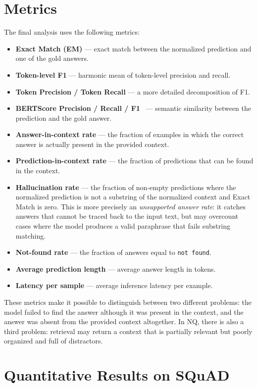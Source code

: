 \documentclass[a4paper,12pt]{article}
\begin{document}
\section{Metrics}
The final analysis uses the following metrics:
\begin{itemize}
    \item \textbf{Exact Match (EM)} — exact match between the normalized prediction and one of the gold answers.
    \item \textbf{Token-level F1} — harmonic mean of token-level precision and recall.
    \item \textbf{Token Precision / Token Recall} — a more detailed decomposition of F1.
    \item \textbf{BERTScore Precision / Recall / F1}~\cite{bertscore} — semantic similarity between the prediction and the gold answer.
    \item \textbf{Answer-in-context rate} — the fraction of examples in which the correct answer is actually present in the provided context.
    \item \textbf{Prediction-in-context rate} — the fraction of predictions that can be found in the context.
    \item \textbf{Hallucination rate} — the fraction of non-empty predictions where the normalized prediction is not a substring of the normalized context and Exact Match is zero. This is more precisely an \emph{unsupported answer rate}: it catches answers that cannot be traced back to the input text, but may overcount cases where the model produces a valid paraphrase that fails substring matching.
    \item \textbf{Not-found rate} — the fraction of answers equal to \texttt{not found}.
    \item \textbf{Average prediction length} — average answer length in tokens.
    \item \textbf{Latency per sample} — average inference latency per example.
\end{itemize}
These metrics make it possible to distinguish between two different problems: the model failed to find the answer although it was present in the context, and the answer was absent from the provided context altogether. In NQ, there is also a third problem: retrieval may return a context that is partially relevant but poorly organized and full of distractors.

\section{Quantitative Results on SQuAD}
\end{document}
